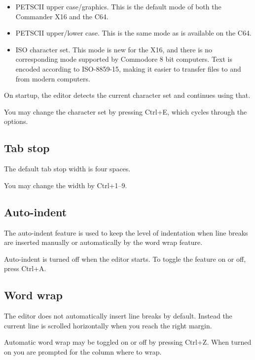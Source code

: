 \documentclass{article}
\begin{document}
        \begin{itemize}
            \item PETSCII upper case/graphics. This is the default mode of both the Commander X16 and the C64.

            \item PETSCII upper/lower case. This is the same mode as is available on the C64.

            \item ISO character set. This mode is new for the X16, and there is no corresponding mode 
            supported by Commodore 8 bit computers. Text is encoded according to ISO-8859-15, making it
            easier to transfer files to and from modern computers.
        \end{itemize}

        On startup, the editor detects the current character set and continues using that.

        You may change the character set by pressing Ctrl+E, which cycles through the options.

    \subsection{Tab stop}
        The default tab stop width is four spaces. 
        
        You may change the width by Ctrl+1--9.
                
    \subsection{Auto-indent}
        The auto-indent feature is used to keep the level of indentation when line breaks are inserted manually or automatically by
        the word wrap feature.

        Auto-indent is turned off when the editor starts. To toggle the feature on or off, press Ctrl+A.

    \subsection{Word wrap}
        The editor does not automatically insert line breaks by default. Instead the current line is scrolled horizontally
        when you reach the right margin.

        Automatic word wrap may be toggled on or off by pressing Ctrl+Z. When turned on you are prompted for the column
        where to wrap.
\end{document}
